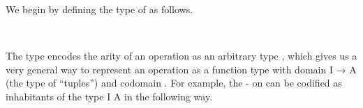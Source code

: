 We begin by defining the type of  as follows.
\ccpad
\begin{code}%
\>[0][@{}l@{\AgdaIndent{0}}]%
\>[1]\AgdaSpace{}%
\AgdaSymbol{:}\AgdaSpace{}%
\AgdaSpace{}%
\AgdaSpace{}%
\AgdaSpace{}%
\AgdaSpace{}%
\AgdaSpace{}%
\AgdaSpace{}%
\AgdaSpace{}%
\AgdaSpace{}%
\AgdaSpace{}%
\<%
\\
%
\>[1]\AgdaSpace{}%
\AgdaSpace{}%
\AgdaSpace{}%
\AgdaSymbol{=}\AgdaSpace{}%
\AgdaSymbol{(}\AgdaSpace{}%
\AgdaSpace{}%
\AgdaSymbol{)}\AgdaSpace{}%
\AgdaSpace{}%
\<%
\end{code}
\ccpad
The type  encodes the arity of an operation as an arbitrary type , which gives us a very general way to represent an operation as a function type with domain \ab I \as → \ab A (the type of ``tuples'') and codomain . For example, the - on  can be codified as inhabitants of the type  \ab I \af A in the following way.
\ccpad
\begin{code}%
\>[0]\AgdaSpace{}%
\AgdaSymbol{:}\AgdaSpace{}%
\AgdaSymbol{\{}\AgdaSpace{}%
\AgdaSymbol{:}\AgdaSpace{}%
\AgdaSpace{}%
%
\AgdaSymbol{\}}\AgdaSpace{}%
\AgdaSymbol{\{}\AgdaSpace{}%
\AgdaSymbol{:}\AgdaSpace{}%
\AgdaSpace{}%
\AgdaSpace{}%
\AgdaSymbol{\}}\AgdaSpace{}%
\AgdaSpace{}%
\AgdaSpace{}%
\AgdaSpace{}%
\AgdaSpace{}%
\AgdaSpace{}%
\<%
\\
\>[0]\AgdaSpace{}%
\AgdaSpace{}%
\AgdaSpace{}%
\AgdaSymbol{=}\AgdaSpace{}%
\AgdaSpace{}%
\<%
\end{code}


